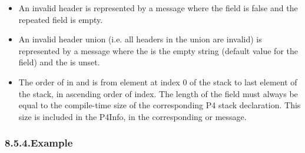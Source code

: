\documentclass[11pt]{article}
\begin{document}
{\begin{itemize}
\item{}
An invalid header is represented by a  message where the 
field is false and the  repeated field is empty.%

\item{}
An invalid header union (i.e. all headers in the union are invalid) is
represented by a  message where the  is the
empty string (default value for the field) and the  is unset.%

\item{}
The order of  in  and  is from
element at index 0 of the stack to last element of the stack, in ascending
order of index. The length of the  field must always be equal to the
compile-time size of the corresponding P4 stack declaration. This size is
included in the P4Info, in the corresponding  or
 message.%
\end{itemize}%

\subsubsection{8.5.4.\hspace*{0.5em}Example}\label{sec-example}%

}
\end{document}
